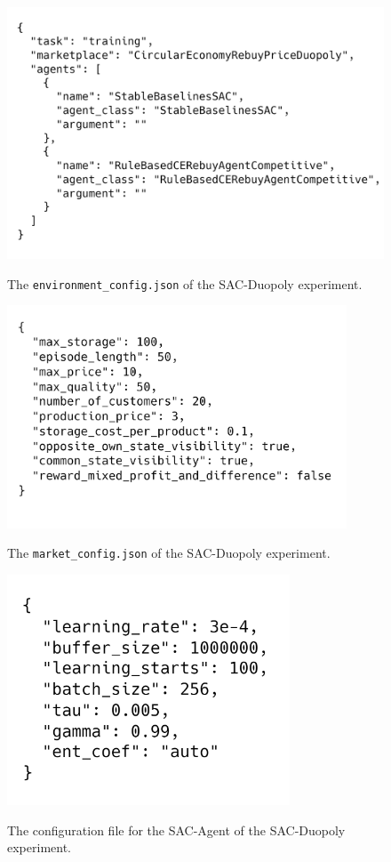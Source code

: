 \begin{figure}[ht]
	\includegraphics[width = \textwidth]{images/configs/SACDuopolyEnvironment.png}\\
	\caption{The \texttt{environment\_config.json} of the SAC-Duopoly experiment.}\label{fig:SACDuopolyConfigEnvironment}
\end{figure}

\begin{figure}[!]
	\includegraphics[width = 0.9\textwidth]{images/configs/SACDuopolyMarket.png}\\
	\caption{The \texttt{market\_config.json} of the SAC-Duopoly experiment.}\label{fig:SACDuopolyConfigMarket}
\end{figure}

\begin{figure}[ht]
	\includegraphics[width = 0.75\textwidth]{images/configs/SACDuopolyAgent.png}\\
	\caption{The configuration file for the SAC-Agent of the SAC-Duopoly experiment.}\label{fig:SACDuopolyConfigAgent}
\end{figure}
